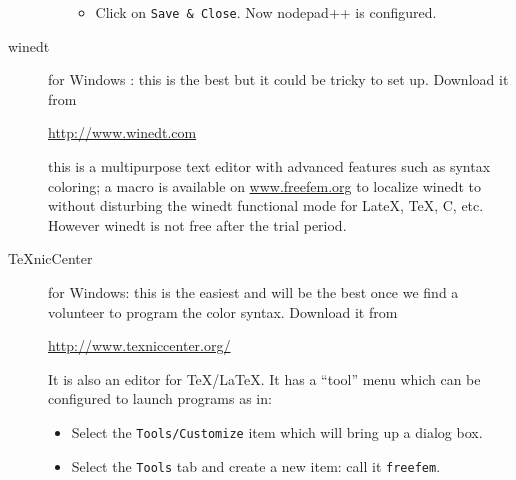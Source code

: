 \documentclass[a4paper,twoside,12pt]{book}
\begin{document}
\begin{description}
\begin{itemize}
\begin{itemize}

\item Click on \texttt{Save \& Close}.  Now nodepad++ is configured.
\end{itemize}
\end{itemize}

%
%

\item[winedt] for Windows : this is the best but it could be tricky to set up.  Download it from
\begin{center}
 \url{http://www.winedt.com}
 \end{center}
this is a multipurpose text editor  with advanced features
such as syntax coloring; a macro is available on \url{www.freefem.org} to localize winedt to \freefempp
without disturbing the winedt functional mode for LateX, TeX, C, etc.  However winedt is not free
after the trial period.

\item[TeXnicCenter] for Windows: this is the easiest and will be the best once we find a volunteer
to program the color syntax.  Download it from
\begin{center}\url{http://www.texniccenter.org/}\end{center}
It is also an editor for TeX/LaTeX. It has a ``tool'' menu which can be configured to launch
\freefempp programs as in:
\begin{itemize}
\item Select the \texttt{Tools/Customize} item which will bring up a dialog box.
\item Select the  \texttt{Tools} tab and  create a new item: call it \texttt{freefem}.


\end{itemize}
\end{description}
\end{document}
